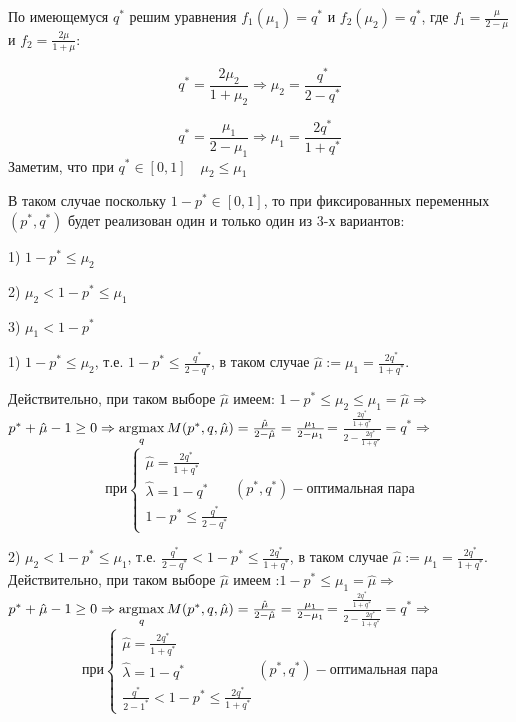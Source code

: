 \begin{flushleft}

По имеющемуся $q^{*}$ решим уравнения $f_1(\mu_1)=q^{*}$ и $f_2(\mu_2)=q^{*}$, где
$f_1=\frac{\mu}{2-\mu}$ и $f_2=\frac{2\mu}{1+\mu}$:

$$q^{*}=\frac{2\mu_2}{1+\mu_2} \Rightarrow \mu_2=\frac{q^{*}}{2-q^{*}}$$

$$q^{*}=\frac{\mu_1}{2-\mu_1} \Rightarrow \mu_1=\frac{2q^{*}}{1+q^{*}}$$
Заметим, что при $q^{*} \in [0, 1] \quad \mu_2 \leq \mu_1$ 

В таком случае поскольку $1-p^{*} \in [0, 1]$, то при фиксированных переменных 
$(p^{*}, q^{*})$ будет реализован один и только один из 3-х вариантов:

1) $1-p^{*} \leq \mu_2$
  
2) $\mu_2 < 1-p^{*} \leq \mu_1$

3) $\mu_1 < 1-p^{*}$
\vspace{5mm}

1) $1-p^{*} \leq \mu_2$, т.е.  $1-p^{*} \leq \frac{q^{*}}{2-q^{*}}$, в таком случае
$\hat{\mu}:=\mu_1=\frac{2q^{*}}{1+q^{*}}$.

Действительно, при таком выборе $\hat{\mu}$ имеем:  $1-p^{*} \leq \mu_2 \leq \mu_1 = \hat{\mu} \Rightarrow$
$p^{*}+\hat{\mu}-1 \geq 0 \Rightarrow \operatorname*{argmax}\limits_{q}M(p^{*},q,\hat{\mu})=
\frac{\hat{\mu}}{2-\hat{\mu}}=\frac{\mu_1}{2-\mu_1}$=
$\frac{\frac{2q^{*}}{1+q^{*}}}{2-\frac{2q^{*}}{1+q^{*}}}=q^{*} \Rightarrow$ 
\[
\textrm{при}
\begin{cases}
\hat{\mu}=\frac{2q^{*}}{1+q^{*}} \\
\hat{\lambda} = 1 - q^{*} \\
1-p^{*} \leq \frac{q^{*}}{2-q^{*}}
\end{cases}
(p^{*}, q^{*}) - \textrm{оптимальная пара}
\] 

2) $\mu_2 < 1-p^{*} \leq \mu_1$, т.е.  $\frac{q^{*}}{2-q^{*}} < 1-p^{*} \leq \frac{2q^{*}}{1+q^{*}}$,
в таком случае $\hat{\mu}:=\mu_1=\frac{2q^{*}}{1+q^{*}}$.
Действительно, при таком выборе $\hat{\mu}$ имеем :$1-p^{*} \leq \mu_1 = \hat{\mu} \Rightarrow$
$p^{*}+\hat{\mu}-1 \geq 0 \Rightarrow \operatorname*{argmax}\limits_{q}M(p^{*},q,\hat{\mu})=
\frac{\hat{\mu}}{2-\hat{\mu}}=\frac{\mu_1}{2-\mu_1}$=
$\frac{\frac{2q^{*}}{1+q^{*}}}{2-\frac{2q^{*}}{1+q^{*}}}=q^{*} \Rightarrow$ 
\[
\textrm{при}
\begin{cases}
\hat{\mu}=\frac{2q^{*}}{1+q^{*}} \\
\hat{\lambda} = 1 - q^{*} \\
\frac{q^{*}}{2-1^{*}} < 1-p^{*} \leq \frac{2q^{*}}{1+q^{*}}
\end{cases}
(p^{*}, q^{*}) - \textrm{оптимальная пара}
\] 


\end{flushleft}
